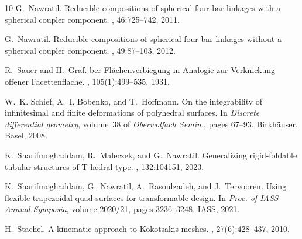 \documentclass{amsart}
\theoremstyle{definition}
\begin{document}
\begin{thebibliography}{10}
G.~Nawratil.
\newblock Reducible compositions of spherical four-bar linkages with a
  spherical coupler component.
, 46:725--742, 2011.

G.~Nawratil.
\newblock Reducible compositions of spherical four-bar linkages without a
  spherical coupler component.
, 49:87--103, 2012.

R.~Sauer and H.~Graf.
ber {F}l{\"a}chenverbiegung in {A}nalogie zur {V}erknickung
  offener {F}acettenflache.
, 105(1):499--535, 1931.

W.~K. Schief, A.~I. Bobenko, and T.~Hoffmann.
\newblock On the integrability of infinitesimal and finite deformations of
  polyhedral surfaces.
\newblock In {\em Discrete differential geometry}, volume~38 of {\em
  Oberwolfach Semin.}, pages 67--93. Birkh\"auser, Basel, 2008.

K.~Sharifmoghaddam, R.~Maleczek, and G.~Nawratil.
\newblock Generalizing rigid-foldable tubular structures of {T}-hedral type.
, 132:104151, 2023.

K.~Sharifmoghaddam, G.~Nawratil, A.~Rasoulzadeh, and J.~Tervooren.
\newblock Using flexible trapezoidal quad-surfaces for transformable design.
\newblock In {\em Proc. of IASS Annual Symposia}, volume 2020/21, pages
  3236--3248. IASS, 2021.

H.~Stachel.
\newblock A kinematic approach to {K}okotsakis meshes.
, 27(6):428--437, 2010.

\end{thebibliography}
\end{document}
